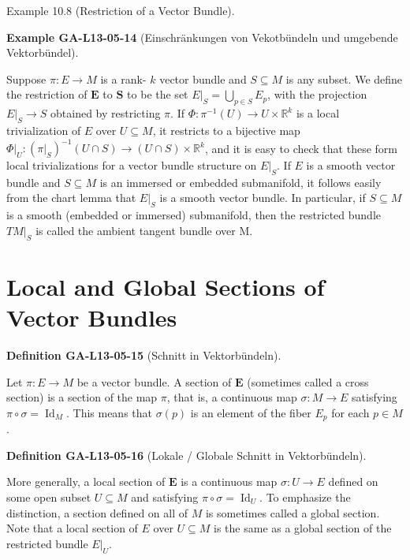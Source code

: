 \documentclass[10pt, letterpaper]{article}
\newcommand{\CustomHeading}[3]{%
  \par\medskip\noindent%
  \textbf{#1 #2} \textnormal{(#3)}.\enskip%
}
\newenvironment{DEF}[2]{\begin{unitbox}\CustomHeading{Definition}{#1}{#2}}{\end{unitbox}}
\newenvironment{EXA}[2]{\begin{unitbox}\CustomHeading{Example}{#1}{#2}}{\end{unitbox}}
\begin{document}
Example 10.8 (Restriction of a Vector Bundle). 

\begin{EXA}{GA-L13-05-14}{Einschränkungen von Vekotbündeln und umgebende Vektorbündel}
Suppose $\pi: E \rightarrow M$ is a rank- $k$ vector bundle and $S \subseteq M$ is any subset. We define the restriction of $\boldsymbol{E}$ to $\boldsymbol{S}$ to be the set $\left.E\right|_{S}=\bigcup_{p \in S} E_{p}$, with the projection $\left.E\right|_{S} \rightarrow S$ obtained by restricting $\pi$. If $\Phi: \pi^{-1}(U) \rightarrow U \times \mathbb{R}^{k}$ is a local trivialization of $E$ over $U \subseteq M$, it restricts to a bijective map $\left.\Phi\right|_{U}:\left(\left.\pi\right|_{S}\right)^{-1}(U \cap S) \rightarrow(U \cap S) \times \mathbb{R}^{k}$, and it is easy to check that these form local trivializations for a vector bundle structure on $\left.E\right|_{S}$. If $E$ is a smooth vector bundle and $S \subseteq M$ is an immersed or embedded submanifold, it follows easily from the chart lemma that $\left.E\right|_{S}$ is a smooth vector bundle. In particular, if $S \subseteq M$ is a smooth (embedded or immersed) submanifold, then the restricted bundle $\left.T M\right|_{S}$ is called the ambient tangent bundle over M.
\end{EXA}

\section*{Local and Global Sections of Vector Bundles}


\begin{DEF}{GA-L13-05-15}{Schnitt in Vektorbündeln}
Let $\pi: E \rightarrow M$ be a vector bundle. A section of $\boldsymbol{E}$ (sometimes called a cross section) is a section of the map $\pi$, that is, a continuous map $\sigma: M \rightarrow E$ satisfying $\pi \circ \sigma=\operatorname{Id}_{M}$. This means that $\sigma(p)$ is an element of the fiber $E_{p}$ for each $p \in M$.
\end{DEF}

\begin{DEF}{GA-L13-05-16}{Lokale / Globale Schnitt in Vektorbündeln}
More generally, a local section of $\boldsymbol{E}$ is a continuous map $\sigma: U \rightarrow E$ defined on some open subset $U \subseteq M$ and satisfying $\pi \circ \sigma=\operatorname{Id}_{U}$. To emphasize the distinction, a section defined on all of $M$ is sometimes called a global section. Note that a local section of $E$ over $U \subseteq M$ is the same as a global section of the restricted bundle $\left.E\right|_{U}$.
\end{DEF}
\end{document}
